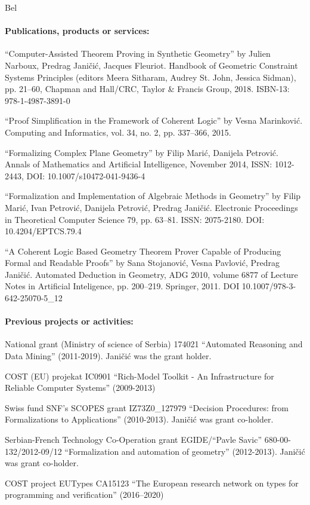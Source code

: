 \begin{sitedescription}{Bel}
  \paragraph*{Publications, products or services:}

  \begin{compactitem}
  \item ``Computer-Assisted Theorem Proving in Synthetic Geometry'' by
    Julien Narboux, Predrag Janičić, Jacques Fleuriot. Handbook of
    Geometric Constraint Systems Principles (editors Meera Sitharam,
    Audrey St. John, Jessica Sidman), pp. 21--60, Chapman and
    Hall/CRC, Taylor \& Francis Group, 2018. ISBN-13: 978-1-4987-3891-0
  \item ``Proof Simplification in the Framework of Coherent Logic'' by
    Vesna Marinković. Computing and Informatics, vol. 34, no. 2,
    pp. 337--366, 2015.
  \item ``Formalizing Complex Plane Geometry'' by Filip Marić,
    Danijela Petrović. Annals of Mathematics and Artificial
    Intelligence, November 2014, ISSN: 1012-2443, DOI:
    10.1007/s10472-041-9436-4
  \item ``Formalization and Implementation of Algebraic Methods in
    Geometry'' by Filip Marić, Ivan Petrović, Danijela Petrović,
    Predrag Janičić. Electronic Proceedings in Theoretical Computer
    Science 79, pp. 63--81. ISSN: 2075-2180. DOI: 10.4204/EPTCS.79.4
  \item ``A Coherent Logic Based Geometry Theorem Prover Capable of
    Producing Formal and Readable Proofs'' by Sana Stojanović, Vesna
    Pavlović, Predrag Janičić. Automated Deduction in Geometry, ADG
    2010, volume 6877 of Lecture Notes in Artificial Inteligence,
    pp. 200--219. Springer, 2011. DOI 10.1007/978-3-642-25070-5\_12
  \end{compactitem}
    
  \paragraph*{Previous projects or activities:}
  
  \begin{compactitem}
  \item National grant (Ministry of science of Serbia) 174021
    ``Automated Reasoning and Data Mining'' (2011-2019). Janičić was
    the grant holder.
  \item COST (EU) projekat IC0901 ``Rich-Model Toolkit - An
    Infrastructure for Reliable Computer Systems'' (2009-2013)
  \item Swiss fund SNF's SCOPES grant IZ73Z0\_127979 ``Decision
    Procedures: from Formalizations to Applications''
    (2010-2013). Jani\v ci\'c was grant co-holder.
  \item Serbian-French Technology Co-Operation grant EGIDE/``Pavle
    Savic'' 680-00-132/2012-09/12 ``Formalization and automation of
    geometry'' (2012-2013). Jani\v ci\'c was grant co-holder.
  \item COST project EUTypes CA15123 ``The European research network on types for programming and verification'' (2016--2020) 
  \end{compactitem}


\end{sitedescription}
